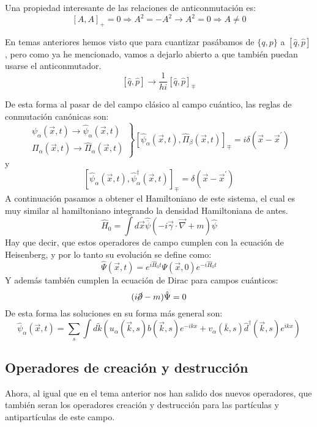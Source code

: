 Una propiedad interesante de las relaciones de anticonmutación es:
$$
[A, A]_{+}=0 \Rightarrow A^2=-A^2 \rightarrow A^2=0 \Rightarrow A \neq 0
$$

En temas anteriores hemos visto que para cuantizar pasábamos de $\{q,p\}$ a $[\hat{q}, \hat{p}]$, pero como ya he mencionado, vamos a dejarlo abierto a que también puedan usarse el anticonmutador. 
$$
[\hat{q}, \hat{p}]\longrightarrow\frac{1}{h i}[\hat{q}, \hat{p}]_{\mp}
$$

De esta forma al pasar de del campo clásico al campo cuántico, las reglas de conmutación canónicas son:
$$
\left.\begin{array}{l}
\psi_\alpha(\vec{x}, t) \longrightarrow \hat{\psi}_\alpha(\vec{x}, t) \\
\Pi_\alpha(\vec{x}, t) \longrightarrow \hat{\Pi}_\alpha(\vec{x}, t)
\end{array}\right\}\left[\hat{\psi}_\alpha(\vec{x}, t), \hat{\Pi}_\beta (\vec{x}, t)\right]_{\mp}=i \delta\left(\vec{x}-\vec{x}^{\prime}\right)
$$
y
$$
\left[\hat{\psi}_\alpha(\vec{x}, t), \hat{\psi}^{\dagger}_\alpha(\vec{x}, t)\right]_{\mp}= \delta\left(\vec{x}-\vec{x}^{\prime}\right)
$$
A continuación pasamos a obtener el Hamiltoniano de este sistema, el cual es muy similar al hamiltoniano integrando la densidad Hamiltoniana de antes. 
$$
\hat{H}_0=\int d \vec{x} \hat{\overline{\psi}}(-i \vec{\gamma} \cdot \vec{\nabla}+m) \hat{\psi}
$$
Hay que decir, que estos operadores de campo cumplen con la ecuación de Heisenberg, y por lo tanto su evolución se define como:
$$
\hat{\Psi}(\vec{x}, t)=e^{i \hat{H}_0 t} \Psi(\vec{x}, 0) e^{-i \hat{H}_0 t}
$$
Y además también cumplen la ecuación de Dirac para campos cuánticos: 
$$
(i\cancel{\partial}-m)\hat{\Psi}=0
$$
De esta forma las soluciones en su forma más general son:
$$
\hat{\psi}_\alpha(\vec{x}, t)=\sum_s \int d \tilde{k}\left(u_\alpha(\vec{k}, s) \hat{b}(\vec{k}, s) e^{-i k x}+v_\alpha(\bar{k}, s) \hat{d}^\dagger(\vec{k}, s) e^{i k x}\right)
$$
\subsection{Operadores de creación y destrucción}
Ahora, al igual que en el tema anterior nos han salido dos nuevos operadores, que también seran los operadores creación y destrucción para las partículas y antipartículas de este campo. 

